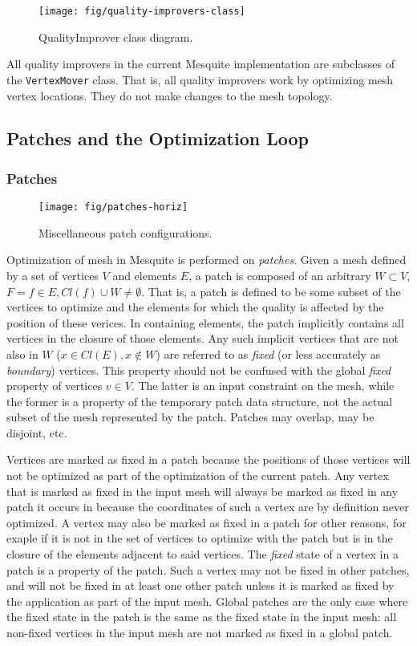 \documentclass{article}
\begin{document}
\begin{figure}[htb]
\texttt{[image: fig/quality-improvers-class]}
\caption{QualityImprover class diagram.\label{fig:qual-improv-class}}
\end{figure}

All quality improvers in the current Mesquite implementation are subclasses of the \texttt{VertexMover} class.  That is, all quality improvers work by optimizing mesh vertex locations.  They do not make changes to the mesh topology.

\subsection{Patches and the Optimization Loop}

\subsubsection{Patches}

\begin{figure}[htb]
\texttt{[image: fig/patches-horiz]}
\caption{Miscellaneous patch configurations.\label{fig:patch-types}}
\end{figure}

Optimization of mesh in Mesquite is performed on \emph{patches}.  Given a mesh defined by a set of vertices $V$ and elements $E$, a patch is composed of an arbitrary $W \subset V$,  $F={f \in E, Cl(f) \cup W \ne \emptyset}$.  That is, a patch is defined to be some subset of the vertices to optimize and the elements for which the quality is affected by the position of these verices.  In containing elements, the patch implicitly contains all vertices in the closure of those elements.  Any such implicit vertices that are not also in $W$ ($x \in Cl(E), x \notin W$) are referred to as \emph{fixed} (or less accurately as \emph{boundary}) vertices.  This property should not be confused with the global \emph{fixed} property of vertices $v \in V$.  The latter is an input constraint on the mesh, while the former is a property of the temporary patch data structure, not the actual subset of the mesh represented by the patch.   Patches may overlap, may be disjoint, etc.  

Vertices are marked as fixed in a patch because the positions of those vertices will not be optimized as part of the optimization of the current patch.  Any vertex that is marked as fixed in the input mesh will always be marked as fixed in any patch it occurs in because the coordinates of such a vertex are by definition never optimized.  A vertex may also be marked as fixed in a patch for other reasons, for exaple if it is not in the set of vertices to optimize with the patch but is in the closure of the elements adjacent to said vertices.  The \emph{fixed} state of a vertex in a patch is a property of the patch.  Such a vertex may not be fixed in other patches, and will not be fixed in at least one other patch unless it is marked as fixed by the application as part of the input mesh.  Global patches are the only case where the fixed state in the patch is the same as the fixed state in the input mesh:  all non-fixed vertices in the input mesh are not marked as fixed in a global patch.
\end{document}
